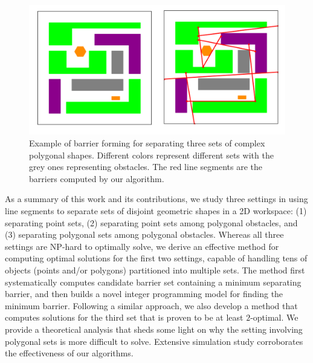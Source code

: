 \begin{figure}[t]
    \centering
    \includegraphics[width=\columnwidth]{chapters/bf/fig/intro_pic.png}
    \caption[Example of barrier forming for separating three sets of complex polygonal shapes]
    {Example of barrier forming for separating three sets of complex polygonal shapes. Different colors represent different sets with the grey ones representing obstacles. The red line segments are the barriers computed by our algorithm.}
    \label{fig:bf-ex}
    \vspace{-0.2in}
\end{figure}
As a summary of this work and its contributions, we study three settings in using line segments to separate sets of disjoint geometric shapes in a 2D workspace: (1) separating point sets, (2) separating point sets among polygonal obstacles, and (3) separating polygonal sets among polygonal obstacles. 
%
Whereas all three settings are NP-hard to optimally solve, we derive an effective method for computing optimal solutions for the first two settings, capable of handling tens of objects (points and/or polygons) partitioned into multiple sets. 
%
The  method first systematically computes candidate barrier set containing a minimum separating barrier, and then builds a novel integer programming model for finding the minimum barrier. 
%
Following a similar approach, we also develop a method that computes solutions for the third set that is proven to be at least $2$-optimal. 
%
We provide a theoretical analysis that sheds some light on why the setting involving polygonal sets is more difficult to solve.
%
Extensive simulation study corroborates the effectiveness of our algorithms. 



